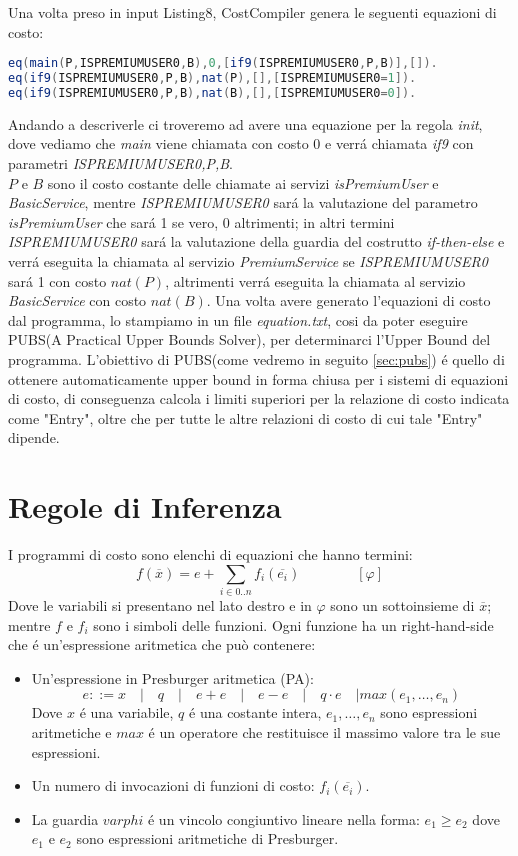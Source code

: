 \documentclass[../../main.tex]{subfiles}
\begin{document}
Una volta preso in input Listing8, CostCompiler genera le seguenti equazioni di costo:
\begin{lstlisting}[language=Java, caption={Equazioni di costo per Listing8}]
eq(main(P,ISPREMIUMUSER0,B),0,[if9(ISPREMIUMUSER0,P,B)],[]).
eq(if9(ISPREMIUMUSER0,P,B),nat(P),[],[ISPREMIUMUSER0=1]).
eq(if9(ISPREMIUMUSER0,P,B),nat(B),[],[ISPREMIUMUSER0=0]).
\end{lstlisting}
Andando a descriverle ci troveremo ad avere una equazione per la regola \textit{init}, dove vediamo che \textit{main} viene chiamata con costo 0 e verrá chiamata \textit{if9} con parametri \textit{ISPREMIUMUSER0,P,B}.\\
$P$ e $B$ sono il costo costante delle chiamate ai servizi \textit{isPremiumUser} e \textit{BasicService}, mentre \textit{ISPREMIUMUSER0} sará la valutazione del parametro \textit{isPremiumUser} che sará 1 se vero, 0 altrimenti; in altri termini \textit{ISPREMIUMUSER0} sará la valutazione della guardia del costrutto \textit{if-then-else} e verrá eseguita la chiamata al servizio \textit{PremiumService} se \textit{ISPREMIUMUSER0} sará 1 con costo $nat(P)$, altrimenti verrá eseguita la chiamata al servizio \textit{BasicService} con costo $nat(B)$. 
Una volta avere generato l'equazioni di costo dal programma, lo stampiamo in un file \textit{equation.txt}, cosi da poter eseguire PUBS(A Practical Upper Bounds Solver), per determinarci l'Upper Bound del programma.
L'obiettivo di PUBS(come vedremo in seguito \ref{sec:pubs}) é quello di ottenere automaticamente upper bound in forma chiusa per i sistemi di equazioni di costo, di conseguenza calcola i limiti superiori per la relazione di costo indicata come "Entry", oltre che per tutte le altre relazioni di costo di cui tale "Entry" dipende.

\section{Regole di Inferenza}
\label{sec:inference_rule}
I programmi di costo sono elenchi di equazioni che hanno termini:
$$f(\overline{x} ) = e + \sum_{i \in 0..n} f_i (\overline{e_i}) \quad \quad \quad \quad[\varphi ]$$
Dove le variabili si presentano nel lato destro e in $\varphi $ sono un sottoinsieme di $\overline{x}$; mentre $f$ e $f_i$ sono i simboli delle funzioni.
Ogni funzione ha un right-hand-side che é un'espressione aritmetica che può contenere:
\begin{itemize}
    \item Un'espressione in Presburger aritmetica (PA):
    $$e ::= x \quad | \quad q \quad | \quad e + e \quad | \quad e - e \quad | \quad q \cdot e \quad |  max(e_1,\dots,e_n)$$
    Dove $x$ é una variabile, $q$ é una costante intera, $e_1,\dots,e_n$ sono espressioni aritmetiche e $max$ é un operatore che restituisce il massimo valore tra le sue espressioni.
    \item Un numero di invocazioni di funzioni di costo: $f_i (\overline{e_i})$.
    \item La guardia $varphi$ é un vincolo congiuntivo lineare nella forma: $e_1 \geq e_2$ dove $e_1$ e $e_2$ sono espressioni aritmetiche di Presburger.
\end{itemize} 
\end{document}
